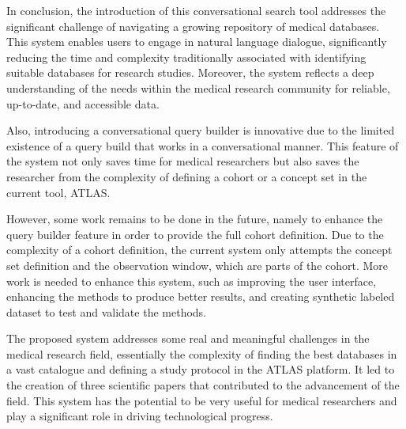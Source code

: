 In conclusion, the introduction of this conversational search tool addresses the significant challenge of navigating a growing repository of medical databases. This system enables users to engage in natural language dialogue, significantly reducing the time and complexity traditionally associated with identifying suitable databases for research studies. Moreover, the system reflects a deep understanding of the needs within the medical research community for reliable, up-to-date, and accessible data.

Also, introducing a conversational query builder is innovative due to the limited existence of a query build that works in a conversational manner. This feature of the system not only saves time for medical researchers but also saves the researcher from the complexity of defining a cohort or a concept set in the current tool, ATLAS.

However, some work remains to be done in the future, namely to enhance the query builder feature in order to provide the full cohort definition. Due to the complexity of a cohort definition, the current system only attempts the concept set definition and the observation window, which are parts of the cohort. More work is needed to enhance this system, such as improving the user interface, enhancing the {\ir} methods to produce better results, and creating synthetic labeled dataset to test and validate the {\ir} methods.

The proposed system addresses some real and meaningful challenges in the medical research field, essentially the complexity of finding the best databases in a vast catalogue and defining a study protocol in the ATLAS platform. It led to the creation of three scientific papers that contributed to the advancement of the field. This system has the potential to be very useful for medical researchers and play a significant role in driving technological progress.
